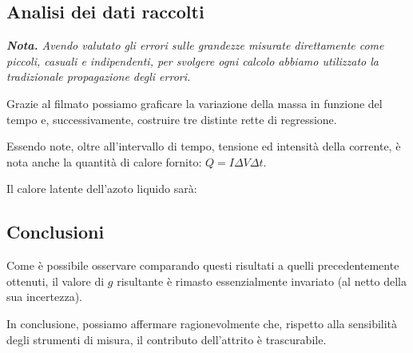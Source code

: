 \documentclass{article}
\begin{document}
\subsection{Analisi dei dati raccolti}
\emph{\textbf{Nota.}
Avendo valutato gli errori sulle grandezze misurate direttamente
come piccoli, casuali e indipendenti, per svolgere ogni calcolo
abbiamo utilizzato la tradizionale propagazione degli errori.
}

  Grazie al filmato possiamo graficare la variazione della massa in funzione del tempo
  e, successivamente, costruire tre distinte rette di regressione.

  Essendo note, oltre all'intervallo di tempo, tensione ed intensità della corrente,
  è nota anche la quantità di calore fornito: $Q = I \Delta V \Delta t$.

  Il calore latente dell'azoto liquido sarà:

\subsection{Conclusioni}

Come è possibile osservare comparando questi risultati a
quelli precedentemente ottenuti, il valore di $g$ risultante
è rimasto essenzialmente invariato (al netto della sua incertezza).

In conclusione, possiamo affermare ragionevolmente che,
rispetto alla sensibilità degli strumenti di misura,
il contributo dell'attrito è trascurabile.
\end{document}
